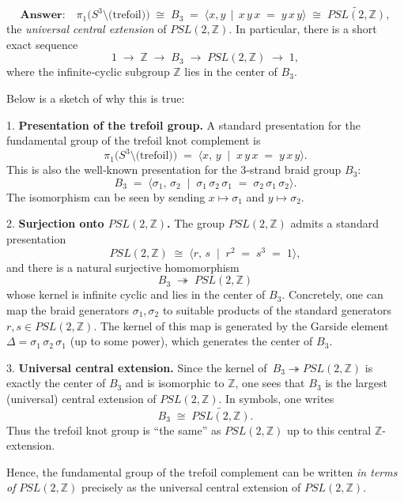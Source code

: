 \documentclass[12p]{article}
\newcounter{answercounter}
\newenvironment{answer}[1][]
{\refstepcounter{answercounter}%
\begin{tcolorbox}[
    title=Answer \theanswercounter: #1,
    colback=white, %
    colframe=gray,
    coltext=black, %
    fonttitle=\bfseries\normalsize,
    top=2mm,
    bottom=2mm,
    enlarge top initially by=5mm
]
\small
}
{\end{tcolorbox}}
\begin{document}
\begin{answer}[by openai/o1 (generated in 0 minutes and 56 seconds.)]
\[
\textbf{Answer:}
\quad
\pi_1\bigl(S^3 \setminus \text{(trefoil)}\bigr)\;\cong\;B_3\;=\;\langle x,y \,\mid\, x\,y\,x \;=\; y\,x\,y\rangle
\;\cong\;\widetilde{PSL(2,\mathbb{Z})},
\]
the \emph{universal central extension} of \(PSL(2,\mathbb{Z})\).  In particular, there is a short exact sequence
\[
1 \;\longrightarrow\; \mathbb{Z} \;\longrightarrow\; B_3 
\;\longrightarrow\; PSL(2,\mathbb{Z}) \;\longrightarrow\; 1,
\]
where the infinite‐cyclic subgroup \(\mathbb{Z}\) lies in the center of \(B_{3}\).

Below is a sketch of why this is true:

1. \textbf{Presentation of the trefoil group.}
   A standard presentation for the fundamental group of the trefoil knot complement is
   \[
   \pi_1\bigl(S^3 \setminus \text{(trefoil)}\bigr)
   \;=\;
   \langle x,\,y \;\mid\; x\,y\,x \;=\; y\,x\,y\rangle.
   \]
   This is also the well‐known presentation for the 3‐strand braid group \(B_3\):
   \[
   B_3 \;=\; \langle \sigma_1,\,\sigma_2 \;\mid\; \sigma_1\,\sigma_2\,\sigma_1 
   \;=\; \sigma_2\,\sigma_1\,\sigma_2\rangle.
   \]
   The isomorphism can be seen by sending \(x \mapsto \sigma_1\) and \(y \mapsto \sigma_2\).

2. \textbf{Surjection onto \(PSL(2,\mathbb{Z})\).}
   The group \(PSL(2,\mathbb{Z})\) admits a standard presentation
   \[
   PSL(2,\mathbb{Z}) 
   \;\cong\;
   \langle r,\,s \;\mid\; r^2 \;=\; s^3 \;=\; 1\rangle,
   \]
   and there is a natural surjective homomorphism 
   \[
   B_3 \;\twoheadrightarrow\; PSL(2,\mathbb{Z})
   \]
   whose kernel is infinite cyclic and lies in the center of \(B_3\).  Concretely, one can map the braid generators \(\sigma_1,\sigma_2\) to suitable products of the standard generators \(r,s\in PSL(2,\mathbb{Z})\).  The kernel of this map is generated by the Garside element \(\Delta = \sigma_1\,\sigma_2\,\sigma_1\) (up to some power), which generates the center of \(B_3\).

3. \textbf{Universal central extension.}
   Since the kernel of 
   \(\,B_3 \twoheadrightarrow PSL(2,\mathbb{Z})\)
   is exactly the center of \(B_3\) and is isomorphic to \(\mathbb{Z}\), one sees that \(B_3\) is the largest (universal) central extension of \(PSL(2,\mathbb{Z})\).  In symbols, one writes 
   \[
   B_3 \;\cong\; \widetilde{PSL(2,\mathbb{Z})}.
   \]
   Thus the trefoil knot group is “the same” as \(PSL(2,\mathbb{Z})\) up to this central \(\mathbb{Z}\)-extension.

Hence, the fundamental group of the trefoil complement can be written \emph{in terms of} \(PSL(2,\mathbb{Z})\) precisely as the universal central extension of \(PSL(2,\mathbb{Z})\).
\end{answer}
\end{document}
